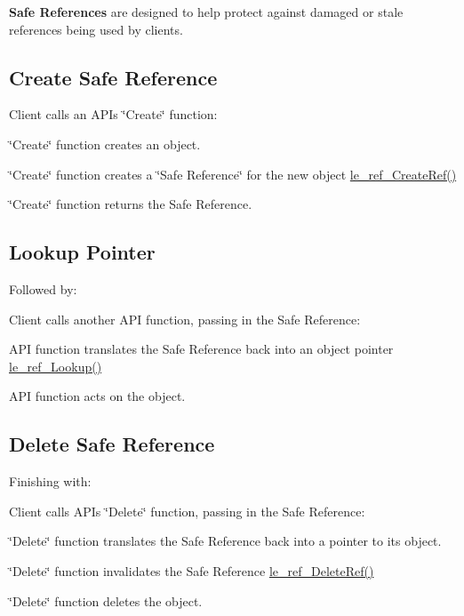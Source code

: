 {\bfseries  Safe References } are designed to help protect against damaged or stale references being used by clients.\hypertarget{c_safe_ref_c_safeRef_create}{}\subsection{Create Safe Reference}\label{c_safe_ref_c_safeRef_create}
Client calls an A\+P\+I\textquotesingle{}s \char`\"{}\+Create\char`\"{} function\+:
\begin{DoxyItemize}
\item \char`\"{}\+Create\char`\"{} function creates an object.
\item \char`\"{}\+Create\char`\"{} function creates a \char`\"{}\+Safe Reference\char`\"{} for the new object {\ttfamily \hyperlink{le__safe_ref_8h_a458597757cbce48e03413b49f52ec240}{le\+\_\+ref\+\_\+\+Create\+Ref()}} 
\item \char`\"{}\+Create\char`\"{} function returns the Safe Reference.
\end{DoxyItemize}\hypertarget{c_safe_ref_c_safeRef_lookup}{}\subsection{Lookup Pointer}\label{c_safe_ref_c_safeRef_lookup}
Followed by\+:

Client calls another A\+P\+I function, passing in the Safe Reference\+:
\begin{DoxyItemize}
\item A\+P\+I function translates the Safe Reference back into an object pointer {\ttfamily \hyperlink{le__safe_ref_8h_a488dddfd579f4a20f39be392c4d7d2e0}{le\+\_\+ref\+\_\+\+Lookup()}} 
\item A\+P\+I function acts on the object.
\end{DoxyItemize}\hypertarget{c_safe_ref_c_safeRef_delete}{}\subsection{Delete Safe Reference}\label{c_safe_ref_c_safeRef_delete}
Finishing with\+:

Client calls A\+P\+I\textquotesingle{}s \char`\"{}\+Delete\char`\"{} function, passing in the Safe Reference\+:
\begin{DoxyItemize}
\item \char`\"{}\+Delete\char`\"{} function translates the Safe Reference back into a pointer to its object.
\item \char`\"{}\+Delete\char`\"{} function invalidates the Safe Reference {\ttfamily \hyperlink{le__safe_ref_8h_a438e18b8ace1d4dda3ca5144a27bd424}{le\+\_\+ref\+\_\+\+Delete\+Ref()}} 
\item \char`\"{}\+Delete\char`\"{} function deletes the object.
\end{DoxyItemize}

